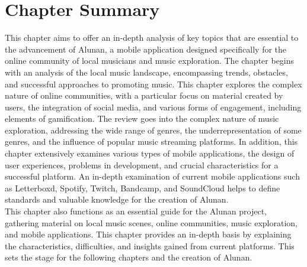 \section{Chapter Summary}
This chapter aims to offer an in-depth analysis of key topics that are essential to the advancement of Alunan, a mobile application designed specifically for the online community of local musicians and music exploration. The chapter begins with an analysis of the local music landscape, encompassing trends, obstacles, and successful approaches to promoting music. This chapter explores the complex nature of online communities, with a particular focus on material created by users, the integration of social media, and various forms of engagement, including elements of gamification. The review goes into the complex nature of music exploration, addressing the wide range of genres, the underrepresentation of some genres, and the influence of popular music streaming platforms. In addition, this chapter extensively examines various types of mobile applications, the design of user experiences, problems in development, and crucial characteristics for a successful platform. An in-depth examination of current mobile applications such as Letterboxd, Spotify, Twitch, Bandcamp, and SoundCloud helps to define standards and valuable knowledge for the creation of Alunan. \\

This chapter also functions as an essential guide for the Alunan project, gathering material on local music scenes, online communities, music exploration, and mobile applications. This chapter provides an in-depth basis by explaining the characteristics, difficulties, and insights gained from current platforms. This sets the stage for the following chapters and the creation of Alunan.